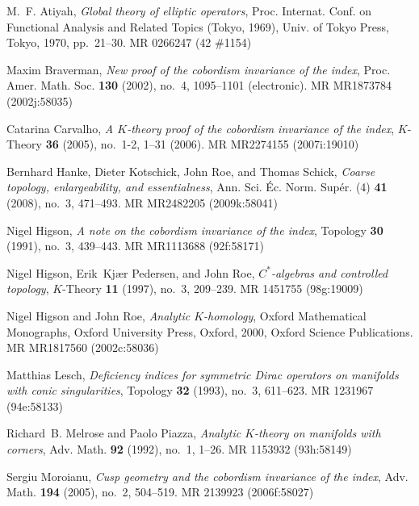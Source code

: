 \documentclass[a4paper]{amsproc}
\theoremstyle{definition}
\theoremstyle{remark}
\numberwithin{equation}{section}
\begin{document}
\providecommand{\bysame}{\leavevmode\hbox to3em{\hrulefill}\thinspace}
\providecommand{\MR}{\relax\ifhmode\unskip\space\fi MR }
\providecommand{\MRhref}[2]{  \href{http://www.ams.org/mathscinet-getitem?mr=#1}{#2}
}
\providecommand{\href}[2]{#2}
\begin{thebibliography}{10}

M.~F. Atiyah, \emph{Global theory of elliptic operators}, Proc. {I}nternat.
  {C}onf. on {F}unctional {A}nalysis and {R}elated {T}opics ({T}okyo, 1969),
  Univ. of Tokyo Press, Tokyo, 1970, pp.~21--30. \MR{0266247 (42 \#1154)}

Maxim Braverman, \emph{New proof of the cobordism invariance of the index},
  Proc. Amer. Math. Soc. \textbf{130} (2002), no.~4, 1095--1101 (electronic).
  \MR{MR1873784 (2002j:58035)}

Catarina Carvalho, \emph{A {$K$}-theory proof of the cobordism invariance of
  the index}, $K$-Theory \textbf{36} (2005), no.~1-2, 1--31 (2006).
  \MR{MR2274155 (2007i:19010)}

Bernhard Hanke, Dieter Kotschick, John Roe, and Thomas Schick, \emph{Coarse
  topology, enlargeability, and essentialness}, Ann. Sci. \'Ec. Norm. Sup\'er.
  (4) \textbf{41} (2008), no.~3, 471--493. \MR{MR2482205 (2009k:58041)}

Nigel Higson, \emph{A note on the cobordism invariance of the index}, Topology
  \textbf{30} (1991), no.~3, 439--443. \MR{MR1113688 (92f:58171)}

Nigel Higson, Erik~Kj{\ae}r Pedersen, and John Roe, \emph{{$C^\ast$}-algebras
  and controlled topology}, $K$-Theory \textbf{11} (1997), no.~3, 209--239.
  \MR{1451755 (98g:19009)}

Nigel Higson and John Roe, \emph{Analytic {$K$}-homology}, Oxford Mathematical
  Monographs, Oxford University Press, Oxford, 2000, Oxford Science
  Publications. \MR{MR1817560 (2002c:58036)}

Matthias Lesch, \emph{Deficiency indices for symmetric {D}irac operators on
  manifolds with conic singularities}, Topology \textbf{32} (1993), no.~3,
  611--623. \MR{1231967 (94e:58133)}

Richard~B. Melrose and Paolo Piazza, \emph{Analytic {$K$}-theory on manifolds
  with corners}, Adv. Math. \textbf{92} (1992), no.~1, 1--26. \MR{1153932
  (93h:58149)}

Sergiu Moroianu, \emph{Cusp geometry and the cobordism invariance of the
  index}, Adv. Math. \textbf{194} (2005), no.~2, 504--519. \MR{2139923
  (2006f:58027)}


\end{thebibliography}
\end{document}
